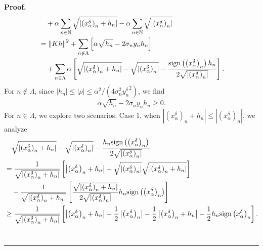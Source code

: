 \documentclass[a4paper,12pt]{article}
\numberwithin{equation}{section}
\newenvironment{proof}[1][Proof]{\textbf{#1.} }
{\ \rule{0.75em}{0.75em}\smallskip}
\begin{document}
\begin{proof}
\begin{align*}
        & \quad +\alpha\sum_{n\in\mathbb{N}} \sqrt{\left|\left(x_{\alpha}^{\delta}\right)_{n}+h_{n}\right|} -\alpha\sum_{n\in\mathbb{N}}\sqrt{\left|\left(x_{\alpha}^{\delta}\right)_{n}\right|} \nonumber\\
        & =\left\|Kh\right\|^{2}+\sum_{n\notin\Lambda}\left[\alpha\sqrt{h_{n}}-2\sigma_{n}y_{n}h_{n}\right] \nonumber\\
        & \quad+\sum_{n\in\Lambda}\alpha\left[\sqrt{\left|\left(x_{\alpha}^{\delta}\right)_{n}+h_{n}\right|} -\sqrt{\left|\left(x_{\alpha}^{\delta}\right)_{n}\right|}-\frac{{\rm sign}\left(\left(x_{\alpha}^{\delta}\right)_{n}\right)h_{n} }{2\sqrt{\left|\left(x_{\alpha}^{\delta}\right)_{n} \right|}}\right].
    \end{align*}
    For $n\notin\Lambda$, since $|h_{n}|\leq|\rho|\leq\alpha^{2}/(4\sigma_{n}^{2} {y^{\delta}_{n}}^{2})$, we find
    \begin{equation*}
        \alpha\sqrt{h_{n}}-2\sigma_{n}y_{n}h_{n}\geq 0.
    \end{equation*}
    For $n\in\Lambda$, we explore two scenarios. Case 1, when $\left|\left(x_{\alpha}^{\delta}\right)_{n}+h_{n}\right|\leq \left|\left(x_{\alpha}^{\delta}\right)_{n}\right|$, we analyze 
    \begin{align*}
        & \quad \sqrt{\left|\left(x_{\alpha}^{\delta}\right)_{n}+h_{n}\right|}- \sqrt{\left|\left(x_{\alpha}^{\delta}\right)_{n}\right|}- \frac{h_{n}{\rm sign} \left(\left(x_{\alpha}^{\delta}\right)_{n}\right)} {2\sqrt{\left|\left(x_{\alpha}^{\delta}\right)_{n}\right|}} \nonumber\\
        & =\frac{1}{\sqrt{\left|\left(x_{\alpha}^{\delta}\right)_{n}+h_{n}\right|}} \left[\left|\left(x_{\alpha}^{\delta}\right)_{n}+h_{n}\right|- \sqrt{\left|\left(x_{\alpha}^{\delta}\right)_{n}\right|} \sqrt{\left|\left(x_{\alpha}^{\delta}\right)_{n}+h_{n}\right|}\right]\nonumber\\
        & \quad -\frac{1}{\sqrt{\left|\left(x_{\alpha}^{\delta}\right)_{n}+h_{n}\right|}} \left[\frac{\sqrt{\left|\left(x_{\alpha}^{\delta}\right)_{n}+h_{n}\right|}} {2\sqrt{\left|\left(x_{\alpha}^{\delta}\right)_{n}\right|}} h_{n} {\rm sign} \left(\left(x_{\alpha}^{\delta}\right)_{n}\right)\right] \nonumber\\
        & \geq \frac{1}{\sqrt{\left|\left(x_{\alpha}^{\delta}\right)_{n}+h_{n}\right|}} \left[\left|\left(x_{\alpha}^{\delta}\right)_{n}+h_{n}\right|- \frac{1}{2}\left|\left(x_{\alpha}^{\delta}\right)_{n}\right|- \frac{1}{2}\left|\left(x_{\alpha}^{\delta}\right)_{n}+h_{n}\right|- \frac{1}{2}h_{n}{\rm sign} \left(x_{\alpha}^{\delta}\right)_{n}\right].

\end{align*}
\end{proof}
\end{document}
